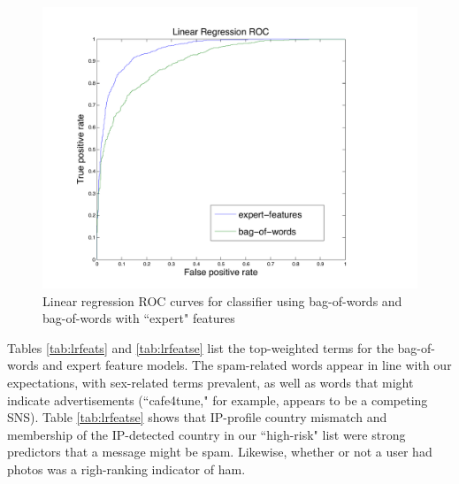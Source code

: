 \documentclass[preprint]{acm_proc_article-sp}
\begin{document}
\begin{figure}[h]
    \centering
    \includegraphics[width=\linewidth]{figures/linear-roc.pdf}
    \caption{Linear regression ROC curves for classifier using bag-of-words and bag-of-words with ``expert" features}
    \label{fig:roclin}
\end{figure}

Tables \ref{tab:lrfeats} and \ref{tab:lrfeatse} list the top-weighted terms for the bag-of-words and expert feature 
models. The spam-related words appear in line with our expectations, with sex-related terms prevalent, as well as
words that might indicate advertisements (``cafe4tune," for example, appears to be a competing SNS). Table \ref{tab:lrfeatse} 
shows that IP-profile country mismatch and membership of the IP-detected country in our ``high-risk" list were 
strong predictors that a message might be spam. Likewise, whether or not a user had photos was a righ-ranking indicator 
of ham.
\end{document}
